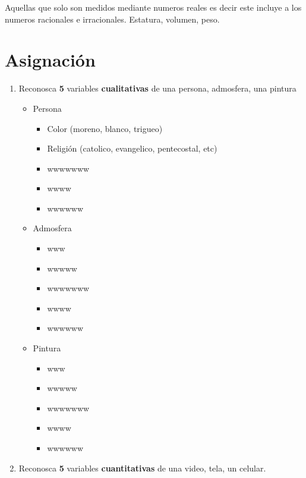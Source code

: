 \documentclass[10pt,]{krantz}
\providecommand{\tightlist}{%
  \setlength{\itemsep}{0pt}\setlength{\parskip}{0pt}}
\theoremstyle{definition}
\theoremstyle{definition}
\theoremstyle{definition}
\theoremstyle{definition}
\theoremstyle{remark}
\begin{document}
Aquellas que solo son medidos mediante numeros reales es decir este incluye a los numeros racionales e irracionales. Estatura, volumen, peso.

\hypertarget{asignaciuxf3n}{%
\section{Asignación}\label{asignaciuxf3n}}

\begin{enumerate}
\def\labelenumi{\arabic{enumi}.}
\item
  Reconosca \textbf{5} variables \textbf{cualitativas} de una persona, admosfera, una pintura

  \begin{itemize}
  \item
    Persona

    \begin{itemize}
    \tightlist
    \item
      Color (moreno, blanco, trigueo)
    \item
      Religión (catolico, evangelico, pentecostal, etc)
    \item
      wwwwwww
    \item
      wwww
    \item
      wwwwww
    \end{itemize}
  \item
    Admosfera

    \begin{itemize}
    \tightlist
    \item
      www
    \item
      wwwww
    \item
      wwwwwww
    \item
      wwww
    \item
      wwwwww
    \end{itemize}
  \item
    Pintura

    \begin{itemize}
    \tightlist
    \item
      www
    \item
      wwwww
    \item
      wwwwwww
    \item
      wwww
    \item
      wwwwww
    \end{itemize}
  \end{itemize}
\item
  Reconosca \textbf{5} variables \textbf{cuantitativas} de una video, tela, un celular.


\end{enumerate}
\end{document}
